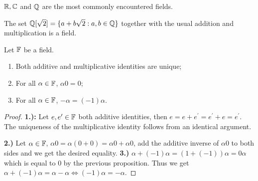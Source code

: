 \begin{example}
	$\mathbb{R}, \mathbb{C}$ and $\mathbb{Q}$ are the most commonly encountered fields.
\end{example}

\begin{example}
	The set $ \mathbb{Q}[\sqrt 2] = \{a + b \sqrt 2 : a, b \in \mathbb{Q} \}$ together with the usual addition and multiplication is a field.
\end{example}

\begin{proposition}
	Let $\mathbb{F}$ be a field.
\begin{enumerate}
	\item Both additive and multiplicative identities are unique; 
	\item For all $\alpha \in \mathbb{F}$, $\alpha 0 = 0$;
	\item For all $\alpha \in \mathbb{F}$, $- \alpha = (-1) \alpha$.
\end{enumerate}
\end{proposition}
\begin{proof}
	\textbf{1.):}
	Let $e, e^\prime \in \mathbb{F}$ both additive identities, then $e = e + e^\prime = e^\prime + e = e^\prime$. The uniqueness of the multiplicative identity follows from an identical argument.	
\par \textbf{2.)} 
Let $\alpha \in \mathbb{F}$, $\alpha 0 = \alpha (0 + 0) = \alpha 0 + \alpha 0$, add the additive inverse of $\alpha 0$ to both sides and we get the desired equality. \textbf{3.)}  $\alpha + (-1)\alpha = (1 + (-1))\alpha = 0\alpha$ which is equal to $0$ by the previous proposition. Thus we get $\alpha + (-1)\alpha = \alpha - \alpha \Leftrightarrow (-1) \alpha = - \alpha$. 
\end{proof}

